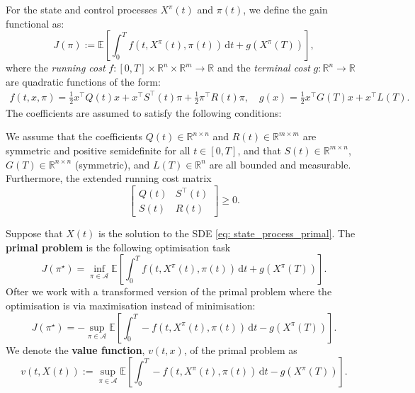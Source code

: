 For the state and control processes $X^\pi(t)$ and $\pi(t)$, we define the gain functional as:
\begin{equation*}
    J(\pi) := \mathbb{E} \left[ \int_0^T f(t, X^\pi(t), \pi(t)) \, \mathrm{d}t + g(X^\pi(T)) \right],
\end{equation*}
where the \textit{running cost} \( f : [0, T] \times \mathbb{R}^n \times \mathbb{R}^m \to \mathbb{R} \) and the \textit{terminal cost} \( g : \mathbb{R}^n \to \mathbb{R} \) are quadratic functions of the form:
\begin{align}
    f(t, x, \pi) = \tfrac{1}{2} x^\top Q(t) x + x^\top S^\top(t) \pi + \tfrac{1}{2} \pi^\top R(t) \pi, \quad
    g(x) = \tfrac{1}{2} x^\top G(T) x + x^\top L(T).  \label{eq: f_and_g}
\end{align}
The coefficients are assumed to satisfy the following conditions:

\begin{assumptions}
We assume that the coefficients $Q(t) \in \mathbb{R}^{n \times n}$ and $R(t) \in \mathbb{R}^{m \times m}$ are symmetric and positive semidefinite for all \( t \in [0, T] \), and that $S(t) \in \mathbb{R}^{m \times n}$, $G(T) \in \mathbb{R}^{n \times n}$ (symmetric), and $L(T) \in \mathbb{R}^n$ are all bounded and measurable. Furthermore, the extended running cost matrix 
\[
\begin{bmatrix}
    Q(t) & S^\top(t) \\
    S(t) & R(t)
\end{bmatrix} \ge 0.
\]
\end{assumptions}

\begin{definition}
    \label{definition: primal_problem}
    Suppose that $X(t)$ is the solution to the SDE \cref{eq: state_process_primal}. The \textbf{primal problem} is the following optimisation task
    \begin{equation*}
    J(\pi^\star) = \inf_{\pi \in \mathcal{A}} \mathbb{E} \left[ \int_0^T f(t, X^\pi(t), \pi(t)) \, \mathrm{d}t + g(X^\pi(T)) \right].
    \end{equation*}
    Ofter we work with a transformed version of the primal problem where the optimisation is via maximisation instead of minimisation: 
    \begin{equation*}
        J(\pi^\star) =  - \sup_{\pi \in \mathcal{A}} \mathbb{E} \left[ \int_0^T  - f(t, X^\pi(t), \pi(t)) \, \mathrm{d}t - g(X^\pi(T)) \right].
    \end{equation*}
    We denote the \textbf{value function}, \( v(t, x) \), of the primal problem as
    \begin{equation*}
        v(t, X(t)) := \sup_{\pi \in \mathcal{A}} \mathbb{E} \left[ \int_0^T  - f(t, X^\pi(t), \pi(t)) \, \mathrm{d}t - g(X^\pi(T)) \right].
    \end{equation*}
\end{definition}


